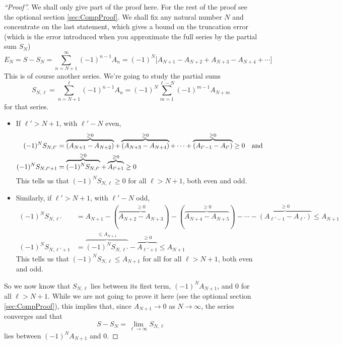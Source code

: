 \begin{proof}[``Proof''] We shall only give part of the proof here.
For the rest of the proof see the optional section \ref{sec:CompProof}.
We shall fix any natural number $N$ and concentrate on the last statement,
which gives a bound on the truncation error (which is the error introduced
when you approximate the full series by the partial sum $S_N$)
\begin{equation*}
E_N = S-S_N= \sum_{n=N+1}^\infty (-1)^{n-1} A_n
= (-1)^N\Big[A_{N+1}-A_{N+2} +A_{N+3}-A_{N+4}+\cdots\Big]
\end{equation*}
This is of course another series. We're going to study the partial sums
\begin{equation*}
S_{N,\ell} = \sum_{n=N+1}^\ell (-1)^{n-1} A_n
= (-1)^N\sum_{m=1}^{\ell-N} (-1)^{m-1} A_{N+m}
\end{equation*}
for that series.
\begin{itemize}
\item
If $\ell'>N+1$, with $\ell'-N$ even,
\begin{align*}
(-1)^N S_{N,\ell'}&=\overbrace{(A_{N+1}-A_{N+2})}^{\ge 0}
                +\overbrace{(A_{N+3}-A_{N+4})}^{\ge 0}+\cdots
                +\overbrace{(A_{\ell'-1}-A_{\ell'})}^{\ge 0}
                \ge 0\quad\hbox{and}\quad\\
(-1)^N S_{N,\ell'+1}&=\overbrace{(-1)^N S_{N,\ell'}}^{\ge 0}
                        +\overbrace{A_{\ell'+1}}^{\ge 0}
                   \ge 0
\end{align*}
This tells us that $(-1)^N S_{N,\ell}\ge 0$ for all $\ell>N+1$, both even and odd.
\item
Similarly, if $\ell'>N+1$, with $\ell'-N$ odd,
\begin{align*}
(-1)^N S_{N,\ell'}&=A_{N+1}-(\overbrace{A_{N+2}-A_{N+3}}^{\ge 0})
                         -(\overbrace{A_{N+4}-A_{N+5}}^{\ge 0})-\cdots
                         -\overbrace{(A_{\ell'-1}-A_{\ell'})}^{\ge 0}
            \le A_{N+1} \\
(-1)^NS_{N,\ell'+1}&=\overbrace{(-1)^N S_{N,\ell'}}^{\le A_{N+1}}
                          -\overbrace{A_{\ell'+1}}^{\ge 0}
               \le A_{N+1}
\end{align*}
This tells us that $(-1)^N S_{N,\ell}\le A_{N+1}$ for all  for all $\ell>N+1$,
both even and odd.
\end{itemize}
So we now know that $S_{N,\ell}$ lies between its first term, $(-1)^NA_{N+1}$,
and $0$ for all $\ell>N+1$. While we are not going to prove it here
(see the optional section \ref{sec:CompProof}), this implies
that, since $A_{N+1}\rightarrow 0$ as $N\rightarrow\infty$, the series
converges and that
\begin{equation*}
S-S_N=\lim_{\ell\rightarrow\infty} S_{N,\ell}
\end{equation*}
lies between $(-1)^NA_{N+1}$ and $0$.

\end{proof}

